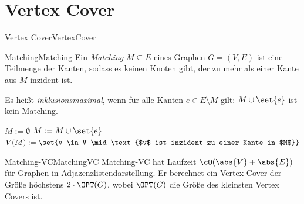 \documentclass[language=ngerman,algolist]{TemplateLecture}
\begin{document}
\section{Vertex Cover}


\begin{prob}{Vertex Cover}{VertexCover}
\end{prob}




\begin{defi}{Matching}{Matching}
    Ein \emph{Matching} $M \subseteq E$ eines Graphen $G = (V, E)$ ist eine Teilmenge der Kanten, sodass es keinen Knoten gibt, der zu mehr als einer Kante aus $M$ inzident ist.

    Es heißt \emph{inklusionsmaximal}, wenn für alle Kanten $e \in E \setminus M$ gilt: $M \cup \set{e}$ ist kein Matching.
\end{defi}
\begin{algorithm}[h]
    \caption{\textsc{Matching-VC}}\label{alg:matching-vc}
    \begin{algorithmic}[1] %
        \State{} $M := \emptyset$
                \State{} $M := M \cup \set{e}$
            \EndIf{}
        \EndFor{}
        \State{} $V(M) := \set{v \in V \mid \text{$v$ ist inzident zu einer Kante in $M$}}$
        \State{} 
    \end{algorithmic}
\end{algorithm}


\begin{thm}{Matching-VC}{MatchingVC}
    Matching-VC hat Laufzeit $\cO(\abs{V} + \abs{E})$ für Graphen in Adjazenzlistendarstellung. Er berechnet ein Vertex Cover der Größe höchstens $2 \cdot \OPT(G)$, wobei $\OPT(G)$ die Größe des kleinsten Vertex Covers ist.
\end{thm}
\end{document}
